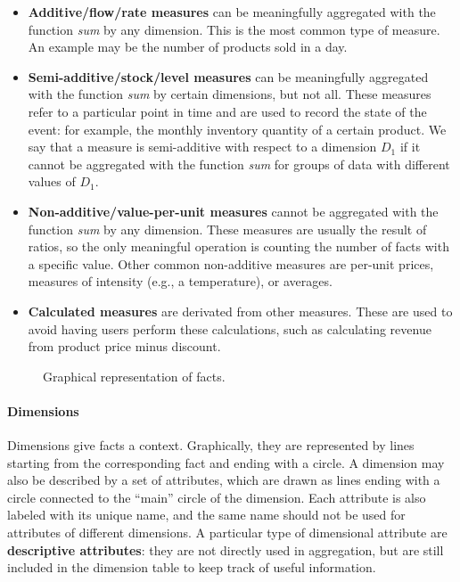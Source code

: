 \begin{itemize}
    \item \textbf{Additive/flow/rate measures} can be meaningfully aggregated with the function \textit{sum} by any dimension. This is the most common type of measure. An example may be the number of products sold in a day.
    \item \textbf{Semi-additive/stock/level measures} can be meaningfully aggregated with the function \textit{sum} by certain dimensions, but not all. These measures refer to a particular point in time and are used to record the state of the event: for example, the monthly inventory quantity of a certain product. We say that a measure is semi-additive with respect to a dimension $D_1$ if it cannot be aggregated with the function \textit{sum} for groups of data with different values of $D_1$.
    \item \textbf{Non-additive/value-per-unit measures} cannot be aggregated with the function \textit{sum} by any dimension. These measures are usually the result of ratios, so the only meaningful operation is counting the number of facts with a specific value. Other common non-additive measures are per-unit prices, measures of intensity (e.g., a temperature), or averages.
    \item \textbf{Calculated measures} are derivated from other measures. These are used to avoid having users perform these calculations, such as calculating revenue from product price minus discount. 
\end{itemize}

\begin{figure}[ht]
    \centering
    
    \caption{Graphical representation of facts.}
\end{figure}

\paragraph{Dimensions} Dimensions give facts a context. Graphically, they are represented by lines starting from the corresponding fact and ending with a circle. A dimension may also be described by a set of attributes, which are drawn as lines ending with a circle connected to the ``main'' circle of the dimension. Each attribute is also labeled with its unique name, and the same name should not be used for attributes of different dimensions. A particular type of dimensional attribute are \textbf{descriptive attributes}: they are not directly used in aggregation, but are still included in the dimension table to keep track of useful information.

